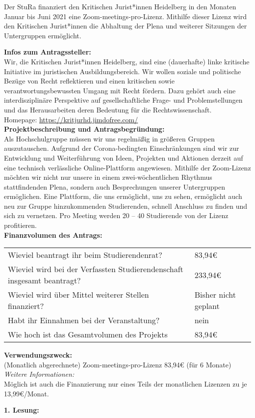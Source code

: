{
    Der StuRa finanziert den Kritischen Jurist*innen Heidelberg in den Monaten Januar bis Juni 2021 eine Zoom-meetings-pro-Lizenz. Mithilfe dieser Lizenz wird den Kritischen Jurist*innen die Abhaltung der Plena und weiterer Sitzungen der Untergruppen ermöglicht.
}{
    \textbf{Infos zum Antragssteller:}\\
    Wir, die Kritischen Jurist*innen Heidelberg, sind eine (dauerhafte) linke kritische Initiative im juristischen Ausbildungsbereich. Wir wollen soziale und politische Bezüge von Recht reflektieren und einen kritischen sowie verantwortungsbewussten Umgang mit Recht fördern. Dazu gehört auch eine interdisziplinäre Perspektive auf gesellschaftliche Frage- und Problemstellungen und das Herausarbeiten deren Bedeutung für die Rechtswissenschaft.\\
    Homepage: \url{https://kritjurhd.jimdofree.com/}\\[1em]
    \textbf{Projektbeschreibung und Antragsbegründung:}\\
    Als Hochschulgruppe müssen wir uns regelmäßig in größeren Gruppen auszutauschen. Aufgrund der Corona-bedingten Einschränkungen sind wir zur Entwicklung und Weiterführung von Ideen, Projekten und Aktionen derzeit auf eine technisch verlässliche Online-Plattform angewiesen. Mithilfe der Zoom-Lizenz möchten wir nicht nur unsere in einem zwei-wöchentlichen Rhythmus stattfindenden Plena, sondern auch Besprechungen unserer Untergruppen ermöglichen. Eine Plattform, die uns ermöglicht, uns zu sehen, ermöglicht auch neu zur Gruppe hinzukommenden Studierenden, schnell Anschluss zu finden und sich zu vernetzen. Pro Meeting werden 20 – 40 Studierende von der Lizenz profitieren.\\[1em]
    \textbf{Finanzvolumen des Antrags:}\\
    \begin{tabular}{l l}
        Wieviel beantragt ihr beim Studierendenrat?                             & 83,94€       \\
        Wieviel wird bei der Verfassten Studierendenschaft insgesamt beantragt? & 233,94€    \\
        Wieviel wird über Mittel weiterer Stellen finanziert?                   & Bisher nicht geplant      \\
        Habt ihr Einnahmen bei der Veranstaltung?                               & nein \\
        Wie hoch ist das Gesamtvolumen des Projekts                             & 83,94€\\
    \end{tabular}
    \newline
    \textbf{Verwendungszweck:}\\
    (Monatlich abgerechnete) Zoom-meetings-pro-Lizenz 83,94€ (für 6 Monate)
    \emph{Weitere Informationen:}\\
    Möglich ist auch die Finanzierung nur eines Teils der monatlichen Lizenzen zu je 13,99€/Monat.
}{
    \textbf{1. Lesung:}
    \ul{
        \ul{}
    }
}
